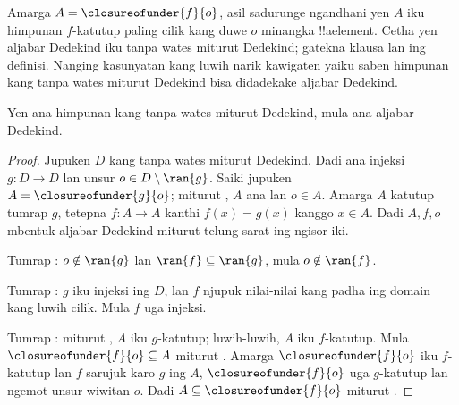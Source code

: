 \documentclass[../../../include/open-logic-section]{subfiles}
\begin{document}
Amarga $A = \closureofunder{f}{o}$, asil sadurunge ngandhani yen $A$
iku himpunan $f$-katutup paling cilik kang duwe $o$ minangka
!!a{element}. Cetha yen aljabar Dedekind iku tanpa wates miturut
Dedekind; gatekna klausa  lan
 ing definisi. Nanging kasunyatan kang luwih narik
kawigaten yaiku saben himpunan kang tanpa wates miturut Dedekind bisa
didadekake aljabar Dedekind.

\begin{thm}
Yen ana himpunan kang tanpa wates miturut Dedekind, mula ana aljabar
Dedekind.
\end{thm}

\begin{proof}
Jupuken $D$ kang tanpa wates miturut Dedekind. Dadi ana injeksi $g \colon D \to
D$ lan unsur $o  \in D \setminus \ran{g}$. Saiki jupuken $A =
\closureofunder{g}{o}$; miturut , $A$ ana lan
$o \in A$. Amarga $A$ katutup tumrap $g$, tetepna $f\colon A\to A$ kanthi $f(x)=g(x)$ kanggo $x\in A$.
Dadi $A, f, o$ mbentuk aljabar Dedekind miturut telung sarat ing ngisor iki.

Tumrap : $o \notin \ran{g}$ lan $\ran{f}
\subseteq \ran{g}$, mula $o\notin \ran{f}$.

Tumrap : $g$ iku injeksi ing $D$, lan $f$ njupuk nilai-nilai kang padha
ing domain kang luwih cilik. Mula $f$ uga injeksi.

Tumrap : miturut , $A$
iku $g$-katutup; luwih-luwih, $A$ iku $f$-katutup. Mula
$\closureofunder{f}{o} \subseteq A$ miturut .
Amarga $\closureofunder{f}{o}$ iku $f$-katutup lan $f$
sarujuk karo $g$ ing $A$, $\closureofunder{f}{o}$ uga $g$-katutup
lan ngemot unsur wiwitan $o$. Dadi $A \subseteq \closureofunder{f}{o}$ miturut
.
\end{proof}
\end{document}

